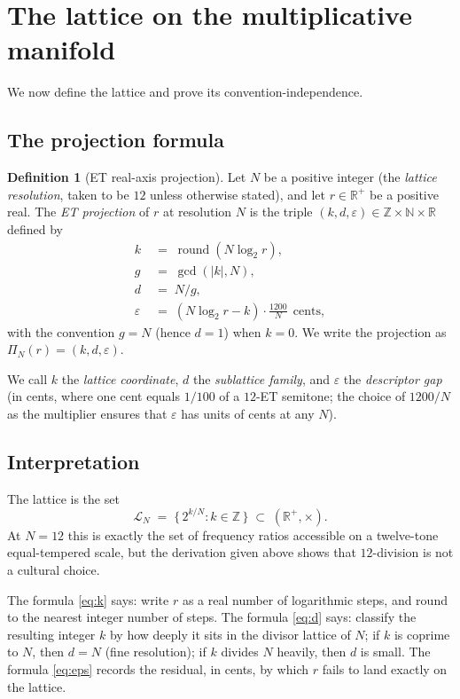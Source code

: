 \documentclass[11pt,a4paper]{article}
\theoremstyle{definition}
\newtheorem{definition}[theorem]{Definition}
\theoremstyle{remark}
\newcommand{\R}{\mathbb{R}}
\newcommand{\Z}{\mathbb{Z}}
\newcommand{\N}{\mathbb{N}}
\DeclareMathOperator{\round}{round}
\newcommand{\eps}{\varepsilon}
\begin{document}
\section{The lattice on the multiplicative manifold}\label{sec:lattice}

We now define the lattice and prove its convention-independence.

\subsection{The projection formula}

\begin{definition}[ET real-axis projection]\label{def:projection}
Let $N$ be a positive integer (the \emph{lattice resolution}, taken to be $12$ unless otherwise stated), and let $r\in\R^{+}$ be a positive real. The \emph{ET projection} of $r$ at resolution $N$ is the triple $(k,d,\eps)\in\Z\times\N\times\R$ defined by
\begin{align}
k &\;=\; \round(N\log_{2}r),\label{eq:k}\\
g &\;=\; \gcd(|k|,N),\\
d &\;=\; N/g,\label{eq:d}\\
\eps &\;=\; (N\log_{2}r - k)\cdot\frac{1200}{N}\ \ \text{cents},\label{eq:eps}
\end{align}
with the convention $g=N$ (hence $d=1$) when $k=0$. We write the projection as $\Pi_{N}(r) = (k,d,\eps)$.
\end{definition}

We call $k$ the \emph{lattice coordinate}, $d$ the \emph{sublattice family}, and $\eps$ the \emph{descriptor gap} (in cents, where one cent equals $1/100$ of a $12$-ET semitone; the choice of $1200/N$ as the multiplier ensures that $\eps$ has units of cents at any $N$).

\subsection{Interpretation}

The lattice is the set
\[
\mathcal{L}_{N} \;=\; \bigl\{\,2^{k/N} : k\in\Z\,\bigr\} \;\subset\; (\R^{+},\times).
\]
At $N=12$ this is exactly the set of frequency ratios accessible on a twelve-tone equal-tempered scale, but the derivation given above shows that $12$-division is not a cultural choice.

The formula \eqref{eq:k} says: write $r$ as a real number of logarithmic steps, and round to the nearest integer number of steps. The formula \eqref{eq:d} says: classify the resulting integer $k$ by how deeply it sits in the divisor lattice of $N$; if $k$ is coprime to $N$, then $d=N$ (fine resolution); if $k$ divides $N$ heavily, then $d$ is small. The formula \eqref{eq:eps} records the residual, in cents, by which $r$ fails to land exactly on the lattice.
\end{document}
